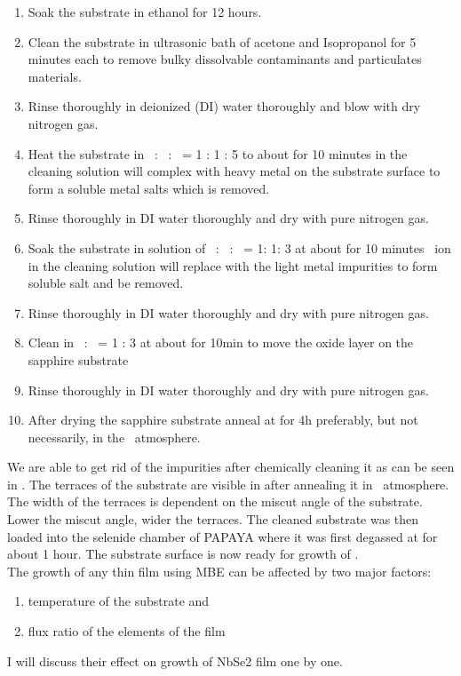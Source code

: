 \begin{enumerate}
    \item Soak the substrate in ethanol for 12 hours.
    \item Clean the substrate in ultrasonic bath of acetone and Isopropanol for 5 minutes each to remove 
    bulky dissolvable contaminants and particulates materials.
    \item Rinse thoroughly in deionized (DI) water thoroughly and blow with dry nitrogen gas.
    \item Heat the substrate in \ammonia\ : \peroxide\ :  \water\ = 1 : 1 : 5 to about  for 10 minutes \ammoniumion in the 
    cleaning solution will complex with heavy metal on the substrate surface to form a soluble metal salts which is removed.
    \item Rinse thoroughly in DI water thoroughly and dry with pure nitrogen gas.
    \item Soak the substrate in solution of \hcl\ : \peroxide\ : \water\ = 1: 1: 3 at about  for 10 minutes \hydrogenion\ ion 
    in the cleaning solution will replace with the light metal impurities to form soluble salt and be removed.
    \item Rinse thoroughly in DI water thoroughly and dry with pure nitrogen gas.
    \item Clean in \sulphuricacid\ : \phosphoricacid\ = 1 : 3 at about  for 10min to move the oxide layer on the sapphire substrate
    \item Rinse thoroughly in DI water thoroughly and dry with pure nitrogen gas.
    \item After drying the sapphire substrate anneal at  for 4h preferably, but not necessarily, in the \oxygen\ atmosphere.
\end{enumerate}



We are able to get rid of the impurities after chemically cleaning it as can be seen in .
The terraces of the substrate are visible in  after annealing it in \oxygen\ atmosphere.
The width of the terraces is dependent on the miscut angle of the substrate. Lower the miscut angle, 
wider the terraces. The cleaned substrate was then loaded into the selenide chamber of PAPAYA where 
it was first degassed at  for about 1 hour. The substrate surface is now ready for growth of \nbse. \\

The growth of any thin film using MBE can be affected by two major factors:
\begin{enumerate}
    \item temperature of the substrate and
    \item flux ratio of the elements of the film
\end{enumerate}
I will discuss their effect on growth of NbSe2 film one by one.


